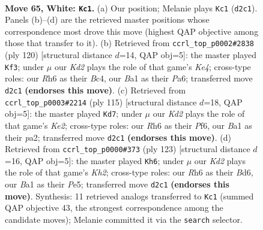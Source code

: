 \documentclass[11pt]{article}
\begin{document}
\clearpage

\begin{figure}[p]\centering
\begin{subfigure}{0.46\textwidth}\centering
\resizebox{\linewidth}{!}{%
\newchessgame
\chessboard[
  setfen={8/2k5/7R/pp4r1/b1p5/P1P5/3K4/B7 w - - 36 65},
  showmover=false,
  pgfstyle=straightmove, color=movearrow, markmove={d2-c1}
]}
\caption{}
\end{subfigure}\hfill
\begin{subfigure}{0.46\textwidth}\centering
\resizebox{\linewidth}{!}{%
\newchessgame
\chessboard[
  setfen={8/p5p1/P1k2b1p/7P/2B1KP2/8/8/8 w - - 27 61},
  showmover=false,
  pgfstyle=straightmove, color=movearrow, markmove={e4-f3}
]}
\caption{}
\end{subfigure}
\\[4pt]
\begin{subfigure}{0.46\textwidth}\centering
\resizebox{\linewidth}{!}{%
\newchessgame
\chessboard[
  setfen={8/4k3/3p1p2/p2B1P1K/4P3/1P6/P2b4/8 b - - 10 58},
  showmover=false,
  pgfstyle=straightmove, color=movearrow, markmove={e7-d7}
]}
\caption{}
\end{subfigure}\hfill
\begin{subfigure}{0.46\textwidth}\centering
\resizebox{\linewidth}{!}{%
\newchessgame
\chessboard[
  setfen={8/7k/3b2p1/4p2p/2B1P2P/1P4P1/6K1/8 b - - 1 62},
  showmover=false,
  pgfstyle=straightmove, color=movearrow, markmove={h7-h6}
]}
\caption{}
\end{subfigure}
\caption{\textbf{Move 65, White: \texttt{Kc1}.} (a) Our position; Melanie plays \texttt{Kc1} (\texttt{d2c1}). Panels (b)--(d) are the retrieved master positions whose correspondence most drove this move (highest QAP objective among those that transfer to it). (b) Retrieved from \texttt{ccrl\_top\_p0002\#2838} (ply 120) [structural distance $d$=14, QAP obj=5]: the master played \texttt{Kf3}; under $\mu$ our \emph{Kd2} plays the role of that game's \emph{Ke4}; cross-type roles: our \emph{R}h6 as their \emph{B}c4, our \emph{B}a1 as their \emph{P}a6; transferred move \texttt{d2c1} \textbf{(endorses this move)}. (c) Retrieved from \texttt{ccrl\_top\_p0003\#2214} (ply 115) [structural distance $d$=18, QAP obj=5]: the master played \texttt{Kd7}; under $\mu$ our \emph{Kd2} plays the role of that game's \emph{Ke2}; cross-type roles: our \emph{R}h6 as their \emph{P}f6, our \emph{B}a1 as their \emph{p}a2; transferred move \texttt{d2c1} \textbf{(endorses this move)}. (d) Retrieved from \texttt{ccrl\_top\_p0000\#373} (ply 123) [structural distance $d$=16, QAP obj=5]: the master played \texttt{Kh6}; under $\mu$ our \emph{Kd2} plays the role of that game's \emph{Kh2}; cross-type roles: our \emph{R}h6 as their \emph{B}d6, our \emph{B}a1 as their \emph{P}e5; transferred move \texttt{d2c1} \textbf{(endorses this move)}. Synthesis: 11 retrieved analogs transferred to \texttt{Kc1} (summed QAP objective 43, the strongest correspondence among the candidate moves); Melanie committed it via the \texttt{search} selector.}
\label{fig:thought-m128}
\end{figure}
\end{document}

